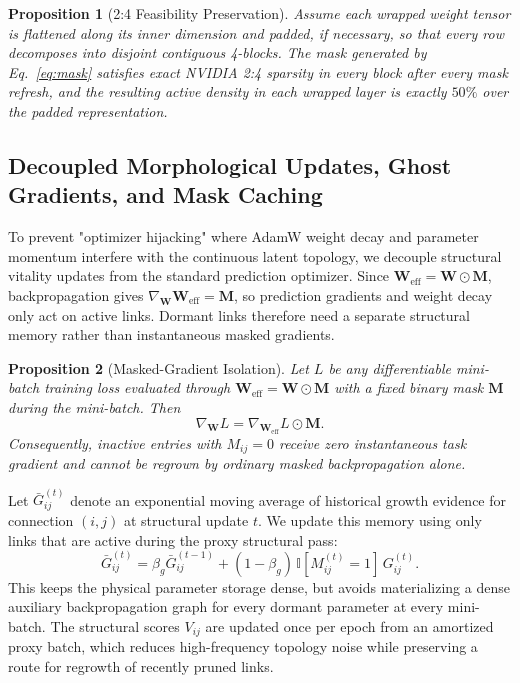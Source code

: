\documentclass[letterpaper]{article} %
\newtheorem{proposition}{Proposition}
\begin{document}
\begin{proposition}[2:4 Feasibility Preservation]
\label{prop:24_feasibility}
Assume each wrapped weight tensor is flattened along its inner dimension and padded, if necessary, so that every row decomposes into disjoint contiguous 4-blocks. The mask generated by Eq.~\ref{eq:mask} satisfies exact NVIDIA 2:4 sparsity in every block after every mask refresh, and the resulting active density in each wrapped layer is exactly $50\%$ over the padded representation.
\end{proposition}

\subsection{Decoupled Morphological Updates, Ghost Gradients, and Mask Caching}
To prevent "optimizer hijacking" where AdamW weight decay and parameter momentum interfere with the continuous latent topology, we decouple structural vitality updates from the standard prediction optimizer. Since $\bm{W}_{\text{eff}}=\bm{W}\odot\bm{M}$, backpropagation gives $\nabla_{\bm{W}}\bm{W}_{\text{eff}}=\bm{M}$, so prediction gradients and weight decay only act on active links. Dormant links therefore need a separate structural memory rather than instantaneous masked gradients.

\begin{proposition}[Masked-Gradient Isolation]
\label{prop:masked_gradient}
Let $L$ be any differentiable mini-batch training loss evaluated through $\bm{W}_{\text{eff}}=\bm{W}\odot\bm{M}$ with a fixed binary mask $\bm{M}$ during the mini-batch. Then
\begin{equation}\label{eq:masked_gradient}
    \nabla_{\bm{W}} L
    =
    \nabla_{\bm{W}_{\text{eff}}} L \odot \bm{M}.
\end{equation}
Consequently, inactive entries with $M_{ij}=0$ receive zero instantaneous task gradient and cannot be regrown by ordinary masked backpropagation alone.
\end{proposition}

Let $\bar{G}_{ij}^{(t)}$ denote an exponential moving average of historical growth evidence for connection $(i,j)$ at structural update $t$. We update this memory using only links that are active during the proxy structural pass:
\begin{equation}\label{eq:ghost_gradient}
    \bar{G}_{ij}^{(t)}
    = \beta_g \bar{G}_{ij}^{(t-1)}
    + (1-\beta_g)\,\mathbb{I}[M_{ij}^{(t)}=1]\,G_{ij}^{(t)} .
\end{equation}
This keeps the physical parameter storage dense, but avoids materializing a dense auxiliary backpropagation graph for every dormant parameter at every mini-batch. The structural scores $V_{ij}$ are updated once per epoch from an amortized proxy batch, which reduces high-frequency topology noise while preserving a route for regrowth of recently pruned links.
\end{document}
